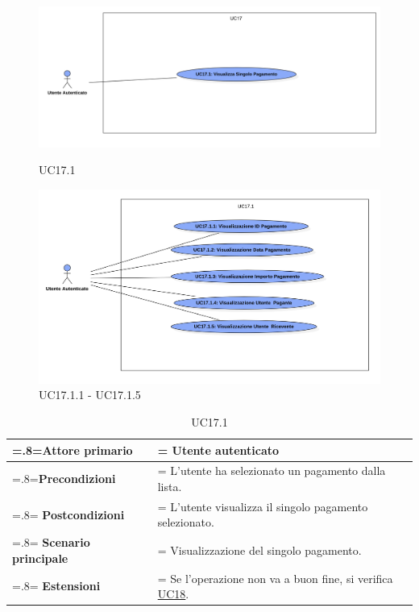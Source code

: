             \begin{figure}[H]
                \centering
                \includegraphics[scale=0.4]{src/img/UC17.1.png}
                \caption{UC17.1}
                \includegraphics[scale=0.4]{src/img/UC17.1.x.png}
                \caption{UC17.1.1 - UC17.1.5}
            \end{figure}

            \begin{table}[H]
                \centering
                \renewcommand{\arraystretch}{1.8}
                \renewcommand\tabularxcolumn[1]{m{#1}}
                \begin{tabularx}{0.9\textwidth} {
                    >{\hsize=.8\hsize\linewidth=\hsize}X
                    >{\hsize=1.2\hsize\linewidth=\hsize}X}
                    \hline
                    \textbf{Attore primario} & Utente autenticato \\
                    \hline
                    \textbf{Precondizioni} & L'utente ha selezionato un pagamento dalla lista. \\
                    \hline
                    \textbf{Postcondizioni} & L'utente visualizza il singolo pagamento selezionato. \\
                    \hline
                    \textbf{Scenario principale} & Visualizzazione del singolo pagamento. \\
                    \hline
                    \textbf{Estensioni} & Se l'operazione non va a buon fine, si verifica \hyperref[UC18]{UC18}. \\
                    \hline
                \end{tabularx}
                \caption{UC17.1}
            \end{table}

